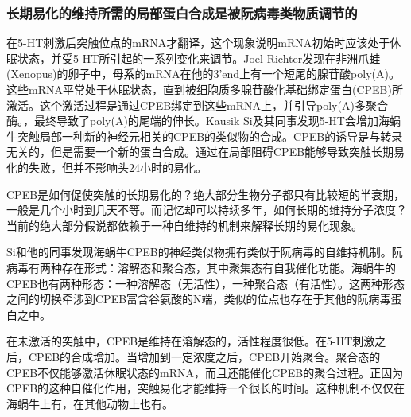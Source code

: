 \documentclass[UTF8,nofonts]{ctexart}
\begin{document}
\subsubsection{长期易化的维持所需的局部蛋白合成是被阮病毒类物质调节的}
在5-HT刺激后突触位点的mRNA才翻译，这个现象说明mRNA初始时应该处于休眠状态，并受5-HT所引起的一系列变化来调节。Joel Richter发现在非洲爪蛙(Xenopus)的卵子中，母系的mRNA在他的3'end上有一个短尾的腺苷酸poly(A)。这些mRNA平常处于休眠状态，直到被细胞质多腺苷酸化基础绑定蛋白(CPEB)所激活。这个激活过程是通过CPEB绑定到这些mRNA上，并引导poly(A)多聚合酶。，最终导致了poly(A)的尾端的伸长。Kausik Si及其同事发现5-HT会增加海蜗牛突触局部一种新的神经元相关的CPEB的类似物的合成。CPEB的诱导是与转录无关的，但是需要一个新的蛋白合成。通过在局部阻碍CPEB能够导致突触长期易化的失败，但并不影响头24小时的易化。
\par
CPEB是如何促使突触的长期易化的？绝大部分生物分子都只有比较短的半衰期，一般是几个小时到几天不等。而记忆却可以持续多年，如何长期的维持分子浓度？当前的绝大部分假说都依赖于一种自维持的机制来解释长期的易化现象。
\par
Si和他的同事发现海蜗牛CPEB的神经类似物拥有类似于阮病毒的自维持机制。阮病毒有两种存在形式：溶解态和聚合态，其中聚集态有自我催化功能。海蜗牛的CPEB也有两种形态：一种溶解态（无活性），一种聚合态（有活性）。这两种形态之间的切换牵涉到CPEB富含谷氨酸的N端，类似的位点也存在于其他的阮病毒蛋白之中。
\par
在未激活的突触中，CPEB是维持在溶解态的，活性程度很低。在5-HT刺激之后，CPEB的合成增加。当增加到一定浓度之后，CPEB开始聚合。聚合态的CPEB不仅能够激活休眠状态的mRNA，而且还能催化CPEB的聚合过程。正因为CPEB的这种自催化作用，突触易化才能维持一个很长的时间。这种机制不仅仅在海蜗牛上有，在其他动物上也有。
\end{document}
